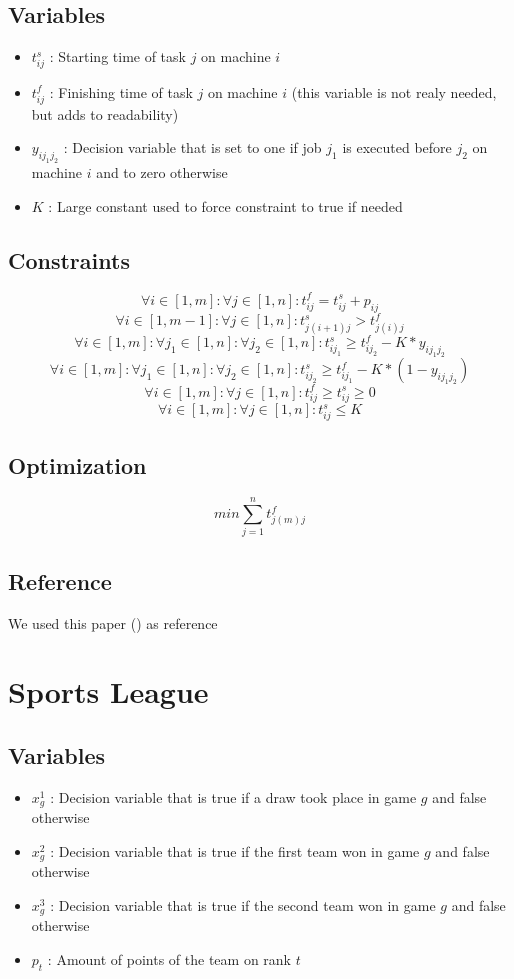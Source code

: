 \documentclass{article}
\begin{document}
\subsection{Variables}
\begin{itemize}
	\item $t^s_{ij}$ : Starting time of task $j$ on machine $i$ 
	\item $t^f_{ij}$ : Finishing time of task $j$ on machine $i$ (this variable is not realy needed, but adds to readability)
	\item $y_{ij_1j_2}$ : Decision variable that is set to one if job $j_1$ is executed before $j_2$ on machine $i$ and to zero otherwise
	\item $K$ : Large constant used to force constraint to true if needed 
\end{itemize}

\subsection{Constraints}
\[ \forall i \in [1,m] : \forall j \in [1,n] : t^f_{ij} = t^s_{ij} + p_{ij} \]
\[ \forall i \in [1,m-1] : \forall j \in [1,n] : t^s_{j(i+1)j} > t^f_{j(i)j}  \]
\[ \forall i \in [1,m] : \forall j_1 \in [1,n] : \forall j_2 \in [1,n] : t^s_{ij_1} \geq t^f_{ij_2} - K*y_{ij_1j_2} \]
\[ \forall i \in [1,m] : \forall j_1 \in [1,n] : \forall j_2 \in [1,n] : t^s_{ij_2} \geq t^f_{ij_1} - K*(1 - y_{ij_1j_2}) \]
\[ \forall i \in [1,m] : \forall j \in [1,n] : t^f_{ij} \geq t^s_{ij} \geq 0 \]
\[ \forall i \in [1,m] : \forall j \in [1,n] : t^s_{ij} \leq K \]

\subsection{Optimization}

\[ min \sum^n_{j=1} t^f_{j(m)j} \]

\subsection{Reference}

We used this paper (\cite{job_shop_scheduling_pedro}) as reference

\section{Sports League}
\subsection{Variables}
\begin{itemize}
	\item $x^1_{g}$ : Decision variable that is true if a draw took place in game $g$ and false otherwise 
	\item $x^2_{g}$ : Decision variable that is true if the first team won in game $g$ and false otherwise 
	\item $x^3_{g}$ : Decision variable that is true if the second team won in game $g$ and false otherwise
	\item $p_{t}$ : Amount of points of the team on rank $t$
\end{itemize}
\end{document}
